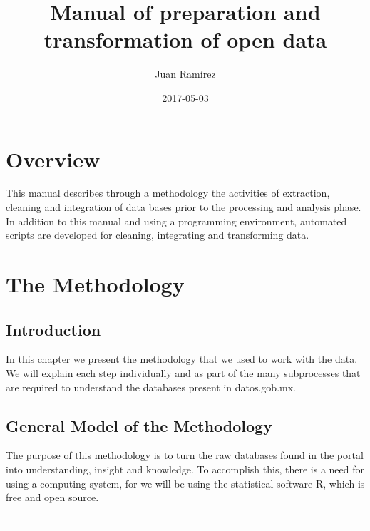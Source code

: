 \documentclass[]{book}
\title{Manual of preparation and transformation of open data}
\author{Juan Ramírez}
\date{2017-05-03}
\begin{document}
\maketitle

{
\setcounter{tocdepth}{1}
\tableofcontents
}
\chapter{Overview}\label{overview}

This manual describes through a methodology the activities of
extraction, cleaning and integration of data bases prior to the
processing and analysis phase. In addition to this manual and using a
programming environment, automated scripts are developed for cleaning,
integrating and transforming data.

\chapter{The Methodology}\label{methodology}

\section{Introduction}\label{introduction}

In this chapter we present the methodology that we used to work with the
data. We will explain each step individually and as part of the many
subprocesses that are required to understand the databases present in
datos.gob.mx.

\section{General Model of the
Methodology}\label{general-model-of-the-methodology}

The purpose of this methodology is to turn the raw databases found in
the portal into understanding, insight and knowledge. To accomplish
this, there is a need for using a computing system, for we will be using
the statistical software R, which is free and open source.

\includegraphics[width=2]{diagrams/data-science}
\end{document}
